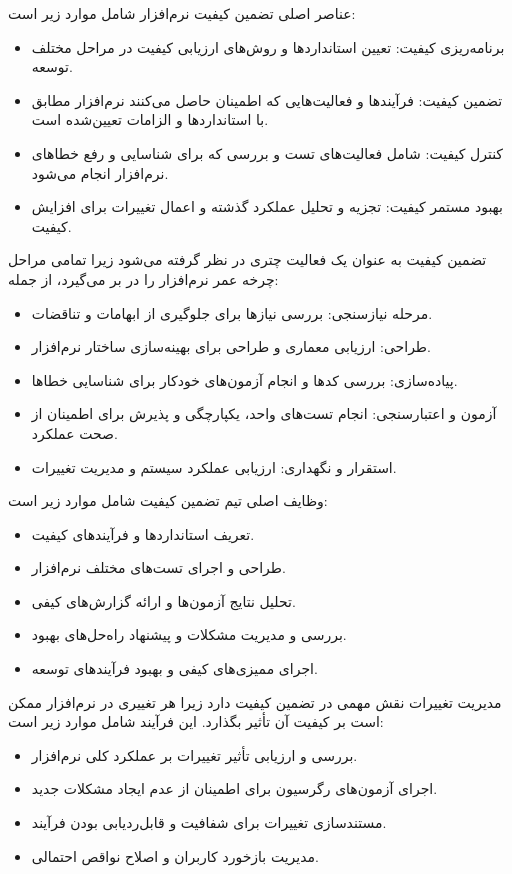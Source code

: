 عناصر اصلی تضمین کیفیت نرم‌افزار شامل موارد زیر است:
\begin{itemize}
    \item {برنامه‌ریزی کیفیت}: تعیین استانداردها و روش‌های ارزیابی کیفیت در مراحل مختلف توسعه.
    \item {تضمین کیفیت}: فرآیندها و فعالیت‌هایی که اطمینان حاصل می‌کنند نرم‌افزار مطابق با استانداردها و الزامات تعیین‌شده است.
    \item {کنترل کیفیت}: شامل فعالیت‌های تست و بررسی که برای شناسایی و رفع خطاهای نرم‌افزار انجام می‌شود.
    \item {بهبود مستمر کیفیت}: تجزیه و تحلیل عملکرد گذشته و اعمال تغییرات برای افزایش کیفیت.
\end{itemize}

تضمین کیفیت به عنوان یک فعالیت چتری در نظر گرفته می‌شود زیرا تمامی مراحل چرخه عمر نرم‌افزار را در بر می‌گیرد، از جمله:
\begin{itemize}
    \item مرحله نیازسنجی: بررسی نیازها برای جلوگیری از ابهامات و تناقضات.
    \item طراحی: ارزیابی معماری و طراحی برای بهینه‌سازی ساختار نرم‌افزار.
    \item پیاده‌سازی: بررسی کدها و انجام آزمون‌های خودکار برای شناسایی خطاها.
    \item آزمون و اعتبارسنجی: انجام تست‌های واحد، یکپارچگی و پذیرش برای اطمینان از صحت عملکرد.
    \item استقرار و نگهداری: ارزیابی عملکرد سیستم و مدیریت تغییرات.
\end{itemize}

وظایف اصلی تیم تضمین کیفیت شامل موارد زیر است:
\begin{itemize}
    \item تعریف استانداردها و فرآیندهای کیفیت.
    \item طراحی و اجرای تست‌های مختلف نرم‌افزار.
    \item تحلیل نتایج آزمون‌ها و ارائه گزارش‌های کیفی.
    \item بررسی و مدیریت مشکلات و پیشنهاد راه‌حل‌های بهبود.
    \item اجرای ممیزی‌های کیفی و بهبود فرآیندهای توسعه.
\end{itemize}

{مدیریت تغییرات} نقش مهمی در تضمین کیفیت دارد زیرا هر تغییری در نرم‌افزار ممکن است بر کیفیت آن تأثیر بگذارد. این فرآیند شامل موارد زیر است:
\begin{itemize}
    \item بررسی و ارزیابی تأثیر تغییرات بر عملکرد کلی نرم‌افزار.
    \item اجرای آزمون‌های رگرسیون برای اطمینان از عدم ایجاد مشکلات جدید.
    \item مستندسازی تغییرات برای شفافیت و قابل‌ردیابی بودن فرآیند.
    \item مدیریت بازخورد کاربران و اصلاح نواقص احتمالی.
\end{itemize}

